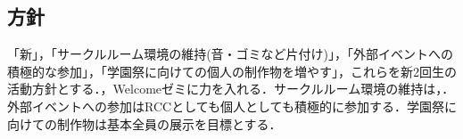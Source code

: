 \subsection*{\newGradeIfKouki{}\secondGrade{}方針}


「新」，「サークルルーム環境の維持(音・ゴミなど片付け)」，「外部イベントへの積極的な参加」，「学園祭に向けての個人の制作物を増やす」，これらを新2回生の活動方針とする．，Welcomeゼミに力を入れる．サークルルーム環境の維持は，．外部イベントへの参加はRCCとしても個人としても積極的に参加する．学園祭に向けての制作物は基本全員の展示を目標とする．
